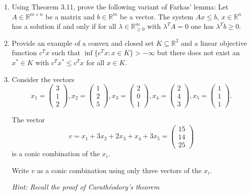 \documentclass[11pt]{article}
\institute{\'Ecole Polytechnique F\'ed\'erale de Lausanne}
\newcommand{\setR}{\mathbb{R}}
\renewcommand{\leq}{\leqslant}
\renewcommand{\geq}{\geqslant}
\begin{document}
\makeheader

\begin{enumerate}[1)]

\item Using Theorem 3.11, prove the following variant of Farkas' lemma:
  Let $A\in\setR^{m\times n}$ be a matrix and $b\in\setR^m$ be a vector.
  The system $Ax \leq b$, $x\in\setR^n$ has a solution if and only if
  for all $\lambda\in\setR^m_{\geq0}$ with $\lambda^T A = 0$ one has $\lambda^T b \geq 0$.
  
  
  \item Provide an example of a convex and closed  set $K\subseteq\setR^2$ and a
  linear objective function $c^Tx$ such that $\inf\{c^Tx \colon
  x\in K\}>-\infty$ but there does not exist an $x^* \in K$ with $c^Tx^* \leq
  c^Tx$ for all $x \in K$. 
  
  \item Consider the vectors
$$ x_1 = \left(\begin{array}{c} 3 \\ 1 \\ 2\end{array}\right), x_2 = \left(\begin{array}{c} 1 \\ 2 \\ 5 \end{array}\right), x_3 = \left(\begin{array}{c} 2 \\ 0 \\ 1 \end{array}\right), x_4 = \left(\begin{array}{c}  2 \\ 4 \\ 3 \end{array}\right), x_5 = \left(\begin{array}{c}  1 \\ 1 \\ 1 \end{array}\right). $$

The vector 
$$ v= x_1 + 3 x_2 + 2 x_3 + x_4 + 3 x_5 =  \left(\begin{array}{c}  15\\ 14 \\ 25 \end{array}\right)$$
is a conic combination of the $x_i$.

Write $v$ as a conic combination using only three vectors of the $x_i$.

\emph{Hint: Recall the proof of Carath\'eodory's theorem}


\end{enumerate}
\end{document}
